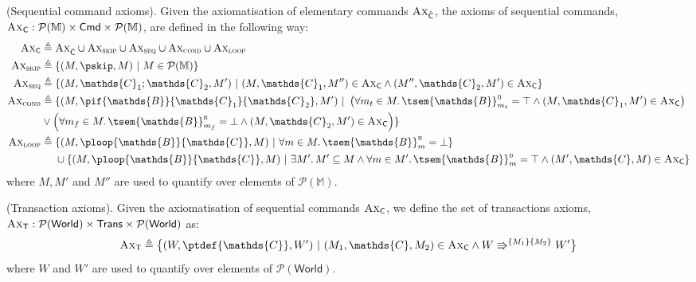 \begin{defn}
	(Sequential command axioms).
	Given the axiomatisation of elementary commands $\textsc{Ax}_{\hat{\mathsf{C}}}$, the axioms of sequential commands, $\textsc{Ax}_\mathsf{C} : \mathcal{P}(\mathbb{M}) \times \mathsf{Cmd} \times \mathcal{P}(\mathbb{M})$, are defined in the following way:
	\begin{align*}
		\textsc{Ax}_\mathsf{C} &\triangleq \textsc{Ax}_{\hat{\mathsf{C}}} \cup \textsc{Ax}_{\textsc{skip}} \cup \textsc{Ax}_{\textsc{seq}} \cup \textsc{Ax}_{\textsc{cond}} \cup \textsc{Ax}_{\textsc{loop}}
		\\
		\textsc{Ax}_{\textsc{skip}} &\triangleq \{ (M, \pskip, M)\ |\ M \in \mathcal{P}(\mathbb{M}) \}
		\\
		\textsc{Ax}_{\textsc{seq}} &\triangleq \{ (M, \mathds{C}_1 ; \mathds{C}_2, M')\ |\ (M, \mathds{C}_1, M'') \in \textsc{Ax}_\mathsf{C} \land (M'', \mathds{C}_2, M') \in \textsc{Ax}_\mathsf{C} \}
		\\
		\textsc{Ax}_{\textsc{cond}}
			&\triangleq \{ 
				(M, \pif{\mathds{B}}{\mathds{C}_1}{\mathds{C}_2}, M')\ 
					|\
				\left( \forall m_t \in M \ldotp \tsem{\mathds{B}}^\textsc{b}_{m_t} = \top \land (M, \mathds{C}_1, M') \in \textsc{Ax}_\mathsf{C} \right) \\ &\lor \left( \forall m_f \in M \ldotp \tsem{\mathds{B}}^\textsc{b}_{m_f} = \bot \land (M, \mathds{C}_2, M') \in \textsc{Ax}_\mathsf{C} \right)
			\}
		\\
		\textsc{Ax}_{\textsc{loop}}
			&\triangleq
				\{
					(M, \ploop{\mathds{B}}{\mathds{C}}, M)\
						|\
					\forall m \in M \ldotp \tsem{\mathds{B}}^\textsc{b}_{m} = \bot
				\}
				\\ &\ \ \ \ \cup
				\{ 
					(M, \ploop{\mathds{B}}{\mathds{C}}, M)\
						|\
					\exists M' \ldotp M' \subseteq M \land \forall m \in M' \ldotp \tsem{\mathds{B}}^\textsc{b}_{m} = \top \land (M', \mathds{C}, M) \in \textsc{Ax}_\mathsf{C}
				\}
	\end{align*}
	where $M, M'$ and $M''$ are used to quantify over elements of $\mathcal{P}(\mathbb{M})$.
\end{defn}

\begin{defn}
	(Transaction axioms).
	Given the axiomatisation of sequential commands $\textsc{Ax}_\mathsf{C}$, we define the set of transactions axioms, $\textsc{Ax}_\mathsf{T} : \mathcal{P}(\mathsf{World}) \times \mathsf{Trans} \times \mathcal{P}(\mathsf{World})$ as:
	\[
		\textsc{Ax}_\mathsf{T}
			\triangleq
		\big\{ (W, \ptdef{\mathds{C}}, W')\ |\ (M_1, \mathds{C}, M_2) \in \textsc{Ax}_\mathsf{C} \land W \Rrightarrow^{\{M_1\}\{M_2\}} W' \big\}
	\]
	where $W$ and $W'$ are used to quantify over elements of $\mathcal{P}(\mathsf{World})$.
\end{defn}

